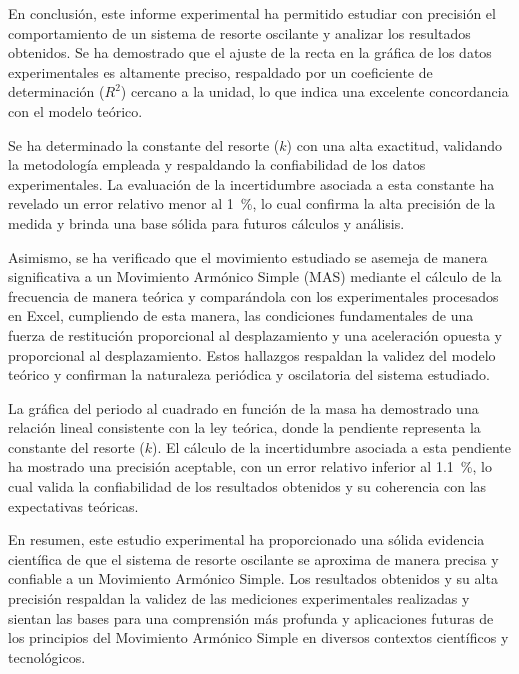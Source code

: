 \documentclass[../main.tex]{subfiles}
\begin{document}
En conclusión, este informe experimental ha permitido estudiar con precisión el comportamiento de un sistema de resorte oscilante y analizar los resultados obtenidos.
Se ha demostrado que el ajuste de la recta en la gráfica de los datos experimentales es altamente preciso, respaldado por un coeficiente de determinación ($R^2$) cercano a la unidad, lo que indica una excelente concordancia con el modelo teórico.

Se ha determinado la constante del resorte ($k$) con una alta exactitud, validando la metodología empleada y respaldando la confiabilidad de los datos experimentales.
La evaluación de la incertidumbre asociada a esta constante ha revelado un error relativo menor al \qty{1}{\percent}, lo cual confirma la alta precisión de la medida y brinda una base sólida para futuros cálculos y análisis.

Asimismo, se ha verificado que el movimiento estudiado se asemeja de manera significativa a un Movimiento Armónico Simple (MAS) mediante el cálculo de la frecuencia de manera teórica y comparándola con los experimentales procesados en Excel, cumpliendo de esta manera, las condiciones fundamentales de una fuerza de restitución proporcional al desplazamiento y una aceleración opuesta y proporcional al desplazamiento.
Estos hallazgos respaldan la validez del modelo teórico y confirman la naturaleza periódica y oscilatoria del sistema estudiado.

La gráfica del periodo al cuadrado en función de la masa ha demostrado una relación lineal consistente con la ley teórica, donde la pendiente representa la constante del resorte ($k$).
El cálculo de la incertidumbre asociada a esta pendiente ha mostrado una precisión aceptable, con un error relativo inferior al \qty{1.1}{\percent}, lo cual valida la confiabilidad de los resultados obtenidos y su coherencia con las expectativas teóricas.

En resumen, este estudio experimental ha proporcionado una sólida evidencia científica de que el sistema de resorte oscilante se aproxima de manera precisa y confiable a un Movimiento Armónico Simple.
Los resultados obtenidos y su alta precisión respaldan la validez de las mediciones experimentales realizadas y sientan las bases para una comprensión más profunda y aplicaciones futuras de los principios del Movimiento Armónico Simple en diversos contextos científicos y tecnológicos.
\end{document}
